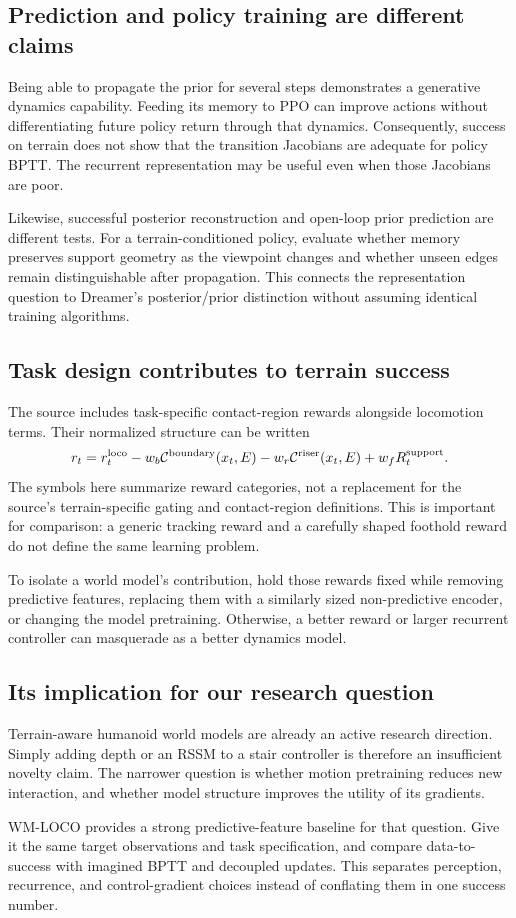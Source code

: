 \subsection{Prediction and policy training are different claims}
Being able to propagate the prior for several steps demonstrates a generative
dynamics capability. Feeding its memory to PPO can improve actions without
differentiating future policy return through that dynamics. Consequently,
success on terrain does not show that the transition Jacobians are adequate
for policy BPTT. The recurrent representation may be useful even when those
Jacobians are poor.

Likewise, successful posterior reconstruction and open-loop prior prediction
are different tests. For a terrain-conditioned policy, evaluate whether memory
preserves support geometry as the viewpoint changes and whether unseen edges
remain distinguishable after propagation. This connects the representation
question to Dreamer's posterior/prior distinction without assuming identical
training algorithms.

\subsection{Task design contributes to terrain success}
The source includes task-specific contact-region rewards alongside locomotion
terms. Their normalized structure can be written
\begin{equation}
r_t=r_t^{\rm loco}-w_b\mathcal C^{\rm boundary}(x_t,E)-w_r\mathcal C^{\rm riser}(x_t,E)
+w_f R_t^{\rm support}.
\end{equation}
The symbols here summarize reward categories, not a replacement for the source's
terrain-specific gating and contact-region definitions. This is important for
comparison: a generic tracking reward and a carefully shaped foothold reward
do not define the same learning problem.

To isolate a world model's contribution, hold those rewards fixed while removing
predictive features, replacing them with a similarly sized non-predictive
encoder, or changing the model pretraining. Otherwise, a better reward or larger
recurrent controller can masquerade as a better dynamics model.

\subsection{Its implication for our research question}
Terrain-aware humanoid world models are already an active research direction.
Simply adding depth or an RSSM to a stair controller is therefore an insufficient
novelty claim. The narrower question is whether motion pretraining reduces new
interaction, and whether model structure improves the utility of its gradients.

WM-LOCO provides a strong predictive-feature baseline for that question. Give it
the same target observations and task specification, and compare data-to-success
with imagined BPTT and decoupled updates. This separates perception, recurrence,
and control-gradient choices instead of conflating them in one success number.
